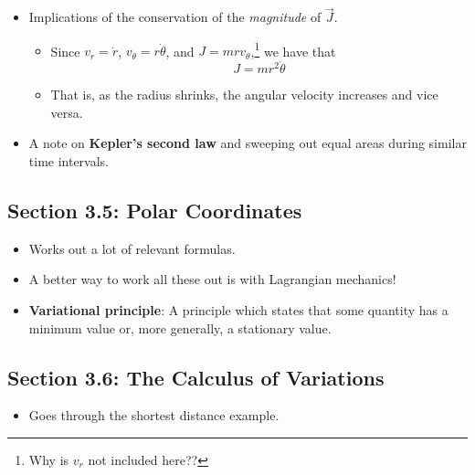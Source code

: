 \documentclass[../notes.tex]{subfiles}
\begin{document}
\begin{itemize}
\begin{figure}[h!]
        \caption{The law of conservation of angular momentum.}
        \label{fig:conservAngMtum}
    \end{figure}
    \begin{itemize}
        \item The motion is always confined to a plane, i.e., the plane to which $\vec{J}$ is normal and in which $\vec{r},\vec{p}$ lie.
        \item This is obvious physically (see Figure \ref{fig:conservAngMtum}).
    \end{itemize}
    \item Implications of the conservation of the \emph{magnitude} of $\vec{J}$.
    \begin{itemize}
        \item Since $v_r=\dot{r}$, $v_\theta=r\dot{\theta}$, and $J=mrv_\theta$,\footnote{Why is $v_r$ not included here??} we have that
        \begin{equation*}
            J = mr^2\dot{\theta}
        \end{equation*}
        \item That is, as the radius shrinks, the angular velocity increases and vice versa.
    \end{itemize}
    \item A note on \textbf{Kepler's second law} and sweeping out equal areas during similar time intervals.
\end{itemize}


\subsection*{Section 3.5: Polar Coordinates}
\begin{itemize}
    \item Works out a lot of relevant formulas.
    \item A better way to work all these out is with Lagrangian mechanics!
    \item \textbf{Variational principle}: A principle which states that some quantity has a minimum value or, more generally, a stationary value.
\end{itemize}


\subsection*{Section 3.6: The Calculus of Variations}
\begin{itemize}
    \item Goes through the shortest distance example.
\end{itemize}
\end{document}
